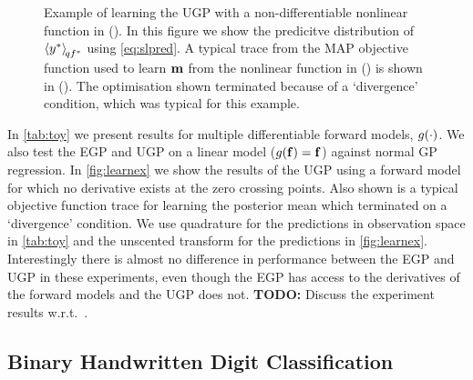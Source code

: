 \documentclass{article} %
\begin{document}
\begin{figure}[tb]
    \caption[]{Example of learning the UGP with a non-differentiable nonlinear
        function in (). In this figure we show the predicitve
        distribution of $\left\langle{\ensuremath{y}\ensuremath{^{*}}}\right\rangle_{\!{qf^{*}}}$ using
        \eqref{eq:slpred}. A typical trace from the MAP objective function used
        to learn $\mathbf{m}$ from the nonlinear function in ()
        is shown in (). The optimisation shown terminated
        because of a `divergence' condition, which was typical for this
        example.}

    \label{fig:learnex}
\end{figure}

In \autoref{tab:toy} we present results for multiple differentiable forward
models, $g\!\left({{\cdot}}\right)$. We also test the EGP and UGP on a linear model
($g\!\left({{\mathbf{f}}}\right) = \mathbf{f}$) against normal GP regression. In
\autoref{fig:learnex} we show the results of the UGP using a forward model for
which no derivative exists at the zero crossing points. Also shown is a typical
objective function trace for learning the posterior mean which terminated on a
`divergence' condition. We use quadrature for the predictions in observation
space in \autoref{tab:toy} and the unscented transform for the predictions in
\autoref{fig:learnex}. Interestingly there is almost no difference in
performance between the EGP and UGP in these experiments, even though the EGP
has access to the derivatives of the forward models and the UGP does not.
\textbf{TODO:} Discuss the experiment results w.r.t.\ \cite{Opper2009}.


\subsection{Binary Handwritten Digit Classification}
\end{document}
